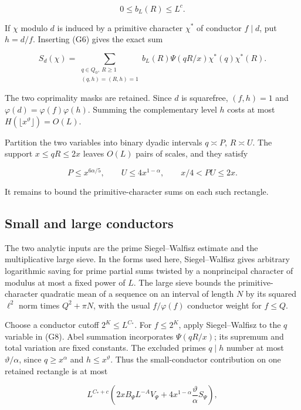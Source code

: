\[
0\le b_L(R)\le L^c. \tag{G7}
\]

If \(\chi\) modulo \(d\) is induced by a primitive character \(\chi^*\)
of conductor \(f\mid d\), put \(h=d/f\). Inserting (G6) gives the exact
sum

\[
S_d(\chi)=\sum_{\substack{q\in Q_0,\ R\ge1\\(q,h)=(R,h)=1}}
 b_L(R)\Psi(qR/x)\chi^*(q)\chi^*(R). \tag{G8}
\]

The two coprimality masks are retained. Since \(d\) is squarefree,
\((f,h)=1\) and \(\varphi(d)=\varphi(f)\varphi(h)\). Summing the
complementary level \(h\) costs at most
\(H(\lfloor x^\vartheta\rfloor)=O(L)\).

Partition the two variables into binary dyadic intervals \(q\asymp P\),
\(R\asymp U\). The support \(x\le qR\le2x\) leaves \(O(L)\) pairs of
scales, and they satisfy

\[
P\le x^{6\alpha/5},\qquad U\le4x^{1-\alpha},\qquad
x/4<PU\le2x. \tag{G9}
\]

It remains to bound the primitive-character sums on each such rectangle.


\hypertarget{congruences-small-and-large-conductors}{%
\subsection{Small and large
conductors}\label{congruences-small-and-large-conductors}}

The two analytic inputs are the prime Siegel--Walfisz estimate and the
multiplicative large sieve. In the forms used here, Siegel--Walfisz
gives arbitrary logarithmic saving for prime partial sums twisted by a
nonprincipal character of modulus at most a fixed power of \(L\). The
large sieve bounds the primitive-character quadratic mean of a sequence
on an interval of length \(N\) by its squared \(\ell^2\) norm times
\(Q^2+\pi N\), with the usual \(f/\varphi(f)\) conductor weight for
\(f\le Q\).

Choose a conductor cutoff \(2^K\le L^{C_*}\). For \(f\le2^K\), apply
Siegel--Walfisz to the \(q\) variable in (G8). Abel summation
incorporates \(\Psi(qR/x)\); its supremum and total variation are fixed
constants. The excluded primes \(q\mid h\) number at most
\(\vartheta/\alpha\), since \(q\ge x^\alpha\) and \(h\le x^\vartheta\).
Thus the small-conductor contribution on one retained rectangle is at
most

\[
L^{C_*+c}\left(
 2xB_\Psi L^{-A}V_\Psi
 +4x^{1-\alpha}\frac\vartheta\alpha S_\Psi\right), \tag{G10}
\]

